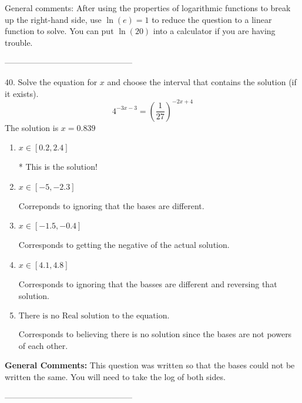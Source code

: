 \documentclass{article}[10pt]
\begin{document}
General comments: After using the properties of logarithmic functions to break up the right-hand side, use $\ln(e) = 1$ to reduce the question to a linear function to solve. You can put $\ln(20)$ into a calculator if you are having trouble.

-----------------------------------------------

40. Solve the equation for $x$ and choose the interval that contains the solution (if it exists).
$$ 4^{-3x-3} = \left(\frac{1}{27}\right)^{-2x+4} $$ 
The solution is $ x = 0.839 $ 

\begin{enumerate}[label=\Alph*.] 
\item $ x \in [0.2, 2.4] $ 

 * This is the solution! 
\item $ x \in [-5, -2.3] $ 

  Correponds to ignoring that the bases are different. 
\item $ x \in [-1.5, -0.4] $ 

  Corresponds to getting the negative of the actual solution. 
\item $ x \in [4.1, 4.8] $ 

  Corresponds to ignoring that the basses are different and reversing that solution. 
\item $ \text{There is no Real solution to the equation.} $ 

  Corresponds to believing there is no solution since the bases are not powers of each other. 
\end{enumerate} 
 
\textbf{General Comments:} This question was written so that the bases could not be written the same. You will need to take the log of both sides.

-----------------------------------------------
\end{document}
